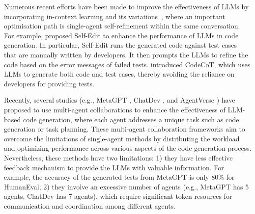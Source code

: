 \documentclass{article}
\begin{document}
Numerous recent efforts have been made to improve the effectiveness of LLMs by incorporating in-context learning and its variations~\cite{Dong2023SelfcollaborationCG,Wei2022ChainOT,Le2023CodeChainTM,Huang2023CodeCoTAB,Zhang2023SelfEditFC,Chen2023TeachingLL,Madaan2023SelfRefineIR}, where an important optimisation path is single-agent self-refinement within the same conversation. For example, \citet{Zhang2023SelfEditFC} proposed Self-Edit to enhance the performance of LLMs in code generation. In particular, Self-Edit runs the  generated code against test cases that are manually written by developers. It then prompts the LLMs to refine the code based on the error messages of failed tests. 
\citet{Huang2023CodeCoTAB} introduced CodeCoT, which uses LLMs to generate both code and test cases, thereby avoiding the reliance on developers for providing tests.

Recently, several studies (e.g., MetaGPT \cite{hong2023metagpt}, ChatDev \cite{qian2023communicative}, and AgentVerse \cite{Chen2023AgentVerseFM}) have proposed to use multi-agent collaborations to enhance the effectiveness of LLM-based code generation, where each agent addresses a unique task such as code generation or task planning. These multi-agent collaboration frameworks aim to overcome the limitations of single-agent methods by distributing the workload and optimizing performance across various aspects of the code generation process.
Nevertheless, these methods have two limitations: 1) they have less effective feedback mechanism to provide the LLMs with valuable information. For example, the accuracy of the generated tests from MetaGPT \cite{hong2023metagpt} is only 80\% for HumanEval;
2) they involve an excessive number of agents (e.g., MetaGPT has 5 agents, ChatDev has 7 agents), which require significant token resources for communication and coordination among different agents.
\end{document}

